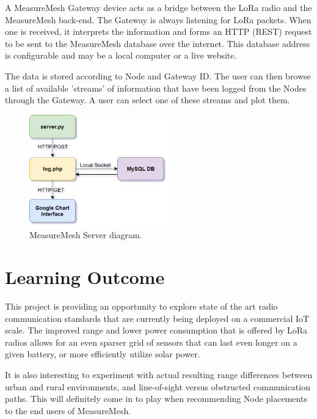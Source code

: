 \documentclass{IEEEtran}
\begin{document}
A MeasureMesh Gateway device acts as a bridge between the LoRa radio and the MeasureMesh back-end. The Gateway is always listening for LoRa packets. When one is received, it interprets the information and forms an HTTP (REST) request to be sent to the MeasureMesh database over the internet. This database address is configurable and may be a local computer or a live website.

The data is stored according to Node and Gateway ID. The user can then browse  a list of available 'streams' of information that have been logged from the Nodes through the Gateway. A user can select one of these streams and plot them.

\begin{figure}
    \centering
    \includegraphics[width=6cm]{images/mm-user-interface}
    \caption{MeasureMesh Server diagram.}
    \label{fig:mm-ui-data}
\end{figure}


\section{Learning Outcome}

This project is providing an opportunity to explore state of the art radio communication standards that are currently being deployed on a commercial IoT scale. The improved range and lower power consumption that is offered by LoRa radios allows for an even sparser grid of sensors that can last even longer on a given battery, or more efficiently utilize solar power. 

It is also interesting to experiment with actual resulting range differences between urban and rural environments, and line-of-sight versus obstructed communication paths. This will definitely come in to play when recommending Node placements to the end users of MeasureMesh.




\end{document}
